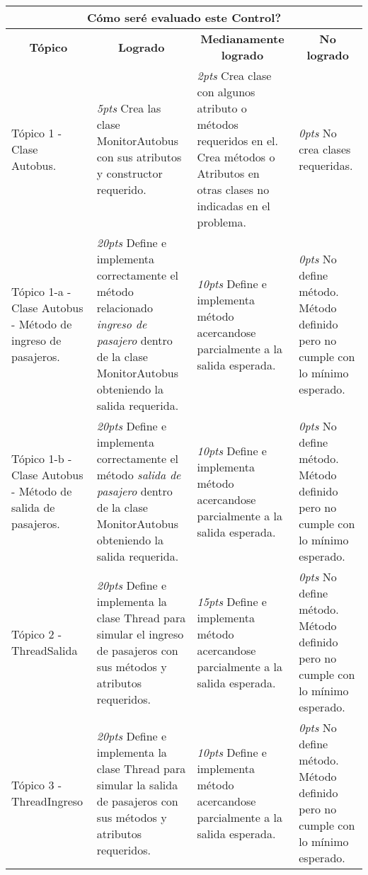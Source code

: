 \documentclass{article}
\begin{document}
	\begin{table}[!ht]
		 {\scriptsize
			\begin{center}
					 \begin{tabular}{|p{4cm}|p{4cm}|p{4cm}|p{4cm}|}\hline
							\multicolumn{4}{|c|}{\textbf{\textquestiondown C\'omo ser\'e evaluado este Control?} } \\ \hline
							\multicolumn{1}{|c|}{\textbf{T\'opico}} &
							\multicolumn{1}{c|}{\textbf{Logrado}} &
							\multicolumn{1}{c|}{\textbf{Medianamente logrado}} &
							\multicolumn{1}{c|}{\textbf{No logrado}} \\ \hline
							T\'opico 1 - Clase Autobus. &
							\emph{5pts} Crea las clase MonitorAutobus con sus atributos y constructor requerido. &
							\emph{2pts} Crea clase con algunos  atributo o m\'etodos	requeridos en el. Crea m\'etodos o Atributos en otras clases no indicadas en el problema. &
							\emph{  0pts} No crea clases requeridas. \\ \hline

							T\'opico 1-a - Clase Autobus - M\'etodo de ingreso de pasajeros. &
							\emph{20pts} Define e implementa correctamente el m\'etodo relacionado \emph{ingreso de pasajero}  dentro de la clase MonitorAutobus obteniendo la salida requerida.  &
							\emph{10pts} Define e implementa m\'etodo acercandose parcialmente a la salida esperada. &
							\emph{ 0pts} No define m\'etodo.  M\'etodo definido pero no cumple con lo m\'inimo esperado.\\ \hline

							T\'opico 1-b - Clase Autobus - M\'etodo de salida de pasajeros. &
							\emph{20pts} Define e implementa correctamente el m\'etodo \emph{salida de pasajero}  dentro de la clase MonitorAutobus obteniendo la salida requerida. &
							\emph{10pts} Define e implementa m\'etodo acercandose parcialmente a la salida esperada. &
							\emph{ 0pts} No define m\'etodo.  M\'etodo definido pero no cumple con lo m\'inimo esperado. \\ \hline

							T\'opico 2 - ThreadSalida&
							\emph{20pts} Define e implementa la clase Thread para simular el ingreso de pasajeros con sus m\'etodos y  atributos requeridos.&
							\emph{15pts} Define e implementa m\'etodo acercandose parcialmente a la salida esperada.  &
							\emph{ 0pts} No define m\'etodo.  M\'etodo definido pero no cumple con lo m\'inimo esperado. \\ \hline

              T\'opico 3 - ThreadIngreso&
							\emph{20pts} Define e implementa la clase Thread para simular la salida de pasajeros con sus m\'etodos y  atributos requeridos.&
							\emph{10pts} Define e implementa m\'etodo acercandose parcialmente a la salida esperada.  &
							\emph{ 0pts} No define m\'etodo.  M\'etodo definido pero no cumple con lo m\'inimo esperado. \\ \hline


\end{tabular}
\end{center}}
\end{table}
\end{document}
